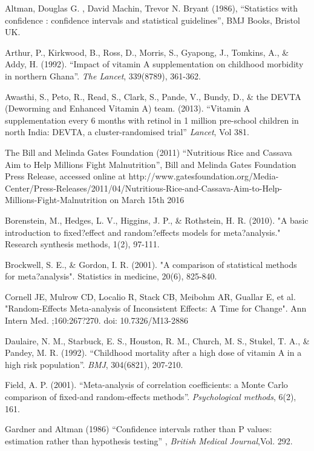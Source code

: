 \documentclass[12pt]{article}
\begin{document}
\begin{thebibliography}{99}

 Altman,  Douglas G. , David Machin, Trevor N. Bryant (1986), ``Statistics with confidence : confidence intervals and statistical guidelines'', BMJ Books, Bristol UK. 

 Arthur, P., Kirkwood, B., Ross, D., Morris, S., Gyapong, J., Tomkins, A., \& Addy, H. (1992). ``Impact of vitamin A supplementation on childhood morbidity in northern Ghana''. \emph{The Lancet}, 339(8789), 361-362.

 Awasthi, S., Peto, R., Read, S., Clark, S., Pande, V., Bundy, D., \& the DEVTA (Deworming and Enhanced Vitamin A) team. (2013). ``Vitamin A supplementation every 6 months with retinol in 1 million pre-school children in north India: DEVTA, a cluster-randomised trial'' \emph{Lancet}, Vol 381.

 The Bill and Melinda Gates Foundation (2011) ``Nutritious Rice and Cassava Aim to Help Millions Fight Malnutrition'', Bill and Melinda Gates Foundation Press Release, accessed online at http://www.gatesfoundation.org/Media-Center/Press-Releases/2011/04/Nutritious-Rice-and-Cassava-Aim-to-Help-Millions-Fight-Malnutrition on March 15th 2016 

 Borenstein, M., Hedges, L. V., Higgins, J. P., \& Rothstein, H. R. (2010). "A basic introduction to fixed?effect and random?effects models for meta?analysis." Research synthesis methods, 1(2), 97-111.

 Brockwell, S. E., \& Gordon, I. R. (2001). "A comparison of statistical methods for meta?analysis". Statistics in medicine, 20(6), 825-840.

 Cornell JE, Mulrow CD, Localio R, Stack CB, Meibohm AR, Guallar E, et al. "Random-Effects Meta-analysis of Inconsistent Effects: A Time for Change". Ann Intern Med. ;160:267?270. doi: 10.7326/M13-2886

 Daulaire, N. M., Starbuck, E. S., Houston, R. M., Church, M. S., Stukel, T. A., \& Pandey, M. R. (1992). ``Childhood mortality after a high dose of vitamin A in a high risk population''. \emph{BMJ}, 304(6821), 207-210.

 Field, A. P. (2001). ``Meta-analysis of correlation coefficients: a Monte Carlo comparison of fixed-and random-effects methods''. \emph{Psychological methods}, 6(2), 161.

 Gardner and Altman (1986) ``Confidence intervals rather than P values: estimation rather than hypothesis testing'' , \emph{British Medical Journal},Vol. 292.


\end{thebibliography}
\end{document}
